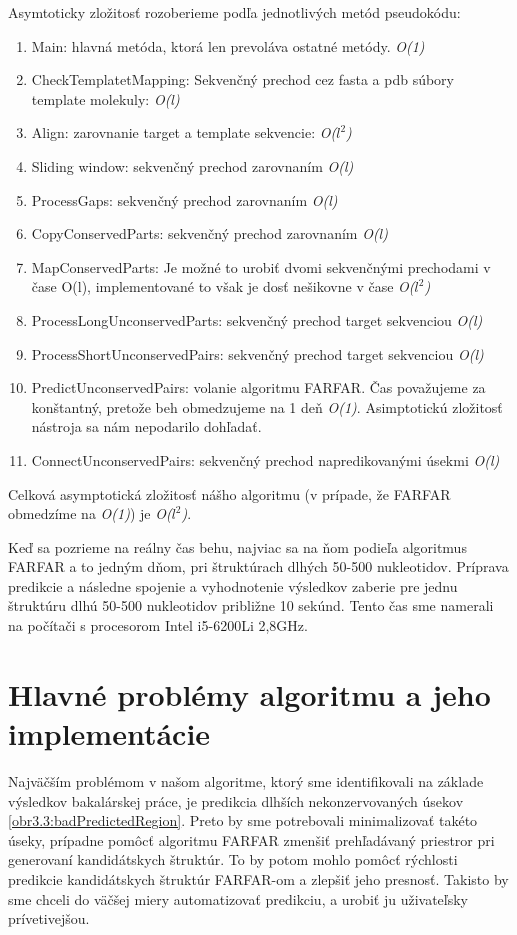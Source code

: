\indent Asymtoticky zložitosť rozoberieme podľa jednotlivých metód pseudokódu:
 \begin{enumerate}
\item Main: hlavná metóda, ktorá len prevoláva ostatné metódy. \textit{O(1)}
\item CheckTemplatetMapping: Sekvenčný prechod cez fasta a pdb súbory template molekuly: \textit{O(l)}
\item Align: zarovnanie target a template sekvencie: \textit{O($l^2$)}
\item Sliding window: sekvenčný prechod zarovnaním \textit{O(l)}
\item ProcessGaps: sekvenčný prechod zarovnaním \textit{O(l)}
\item CopyConservedParts: sekvenčný prechod zarovnaním \textit{O(l)}
\item MapConservedParts: Je možné to urobiť dvomi sekvenčnými prechodami v čase O(l), implementované to však je dosť nešikovne v čase \textit{O($l^2$)} 
\item ProcessLongUnconservedParts: sekvenčný prechod target sekvenciou \textit{O(l)}
\item ProcessShortUnconservedPairs: sekvenčný prechod target sekvenciou \textit{O(l)}
\item PredictUnconservedPairs: volanie algoritmu FARFAR. Čas považujeme za konštantný, pretože beh obmedzujeme na 1 deň \textit{O(1)}. Asimptotickú zložitosť nástroja sa nám nepodarilo dohľadať. 
\item ConnectUnconservedPairs: sekvenčný prechod napredikovanými úsekmi \textit{O(l)}
 \end{enumerate}

Celková asymptotická zložitosť nášho algoritmu (v prípade, že FARFAR obmedzíme na \textit{O(1)}) je  \textit{O($l^2$)}. 

\indent Keď sa pozrieme na reálny čas behu, najviac sa na ňom podieľa algoritmus FARFAR a to jedným  dňom, pri štruktúrach dlhých 50-500 nukleotidov. Príprava predikcie a následne spojenie a vyhodnotenie výsledkov zaberie pre jednu štruktúru dlhú 50-500 nukleotidov približne 10 sekúnd. Tento čas sme namerali na počítači s procesorom Intel i5-6200Li 2,8GHz.


\section{Hlavné problémy algoritmu a jeho implementácie}
Najväčším problémom v našom algoritme, ktorý sme identifikovali na základe výsledkov bakalárskej práce, je predikcia dlhších nekonzervovaných úsekov \autoref{obr3.3:badPredictedRegion}. Preto by sme potrebovali minimalizovať takéto úseky, prípadne pomôcť algoritmu FARFAR zmenšiť prehľadávaný priestror pri generovaní kandidátskych štruktúr. To by potom mohlo pomôcť rýchlosti predikcie kandidátskych štruktúr FARFAR-om a zlepšiť jeho presnosť. Takisto by sme chceli do väčšej miery automatizovať predikciu, a urobiť ju uživateľsky prívetivejšou.

